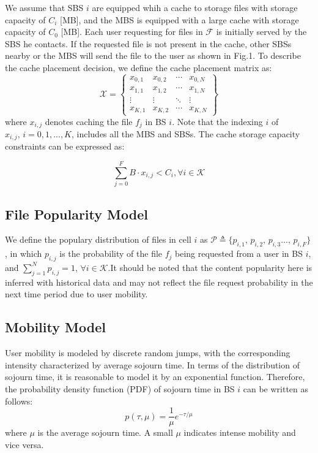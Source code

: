 \documentclass[conference]{IEEEtran}
\begin{document}
We assume that SBS $i$ are equipped whih a cache to storage files with storage capacity of $C_i$ [MB], and the MBS is equipped with a large cache with storage capacity of
$C_0$ [MB]. Each user requesting for files in $\mathcal{F}$ is initially served by the SBS he contacts. If the requested file is not present in the cache, other SBSs nearby or the MBS will send the file to the user as shown in Fig.1. To describe the cache placement decision, we define the cache placement matrix as:
$$\mathcal{X}=
\begin{Bmatrix}
x_{0,1}    &x_{0,2}  & \cdots & x_{0,N} \\
x_{1,1}    &x_{1,2}  & \cdots & x_{1,N} \\
\vdots    &\vdots  & \ddots &\vdots \\
x_{K,1}    &x_{K,2}  & \cdots & x_{K,N}
\end{Bmatrix}
$$
where $x_{i,j}$ denotes caching the file $f_j$ in BS $i$. Note that the indexing $i$ of $x_{i,j}\mathrm{,\,} i=0,1,...,K$, includes all the MBS and SBSs. The cache storage capacity constraints can be expressed as:

\begin{equation}
\sum_{j=0}^F B\cdot x_{i,j}<C_i,\forall{i}\in\mathcal{K}
\end{equation}

\subsection{File Popularity Model}
We define the populary distribution of files in cell $i$ as $\mathcal{P} \triangleq\{p_{i,1}\mathrm{,\,}p_{i,2}\mathrm{,\,}p_{i,3}...\mathrm{,\,}p_{i,F}\}$, in which $p_{i,j}$ is the probability of the file $f_j$ being requested from a user in BS $i$, and $ \sum_{j=1}^N p_{i,j}=1,\,\forall{i}\in\mathcal{K}$.It should be noted that the content popularity here is inferred with historical data and may not reflect the file request probability in the next time period due to user mobility.

\subsection{Mobility Model}
User mobility is modeled by discrete random jumps, with the corresponding intensity characterized by average sojourn time. In terms of the distribution of sojourn time, it is reasonable to model it by an exponential function\cite{8013789}. Therefore, the probability density function (PDF) of sojourn time in BS $i$ can be written as follows:
\begin{equation}
p(\tau,\mu)=\frac{1}{\mu}e^{-\tau/\mu}
\end{equation}
where $\mu$ is the average sojourn time. A small $\mu$ indicates intense mobility and vice versa.
\end{document}
